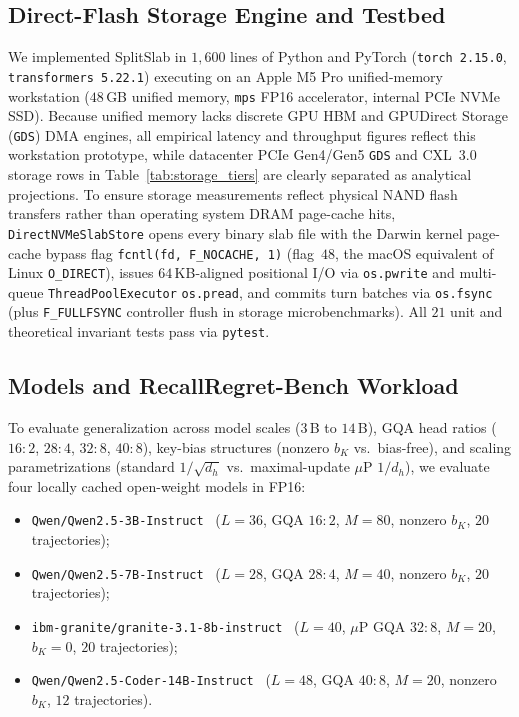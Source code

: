 \documentclass[final,5p,times,twocolumn]{elsarticle}
\theoremstyle{definition}
\theoremstyle{remark}
\newcommand{\SplitSlab}{\textup{\textsc{SplitSlab}}}
\newcommand{\RecallBench}{\textup{\textsc{RecallRegret-Bench}}}
\def\SplitSlab{SplitSlab}%
\def\RecallBench{RecallRegret-Bench}%
\begin{document}
\subsection{Direct-Flash Storage Engine and Testbed}
We implemented \SplitSlab{} in $1{,}600$ lines of Python and PyTorch (\texttt{torch 2.15.0}, \texttt{transformers 5.22.1}) executing on an Apple M5 Pro unified-memory workstation ($48$\,GB unified memory, \texttt{mps} FP16 accelerator, internal PCIe NVMe SSD). Because unified memory lacks discrete GPU HBM and GPUDirect Storage (\texttt{GDS}) DMA engines, all empirical latency and throughput figures reflect this workstation prototype, while datacenter PCIe Gen4/Gen5 \texttt{GDS} and CXL~3.0 storage rows in Table~\ref{tab:storage_tiers} are clearly separated as analytical projections. To ensure storage measurements reflect physical NAND flash transfers rather than operating system DRAM page-cache hits, \texttt{DirectNVMeSlabStore} opens every binary slab file with the Darwin kernel page-cache bypass flag \texttt{fcntl(fd, F\_NOCACHE, 1)} (flag~$48$, the macOS equivalent of Linux \texttt{O\_DIRECT}), issues $64$\,KB-aligned positional I/O via \texttt{os.pwrite} and multi-queue \texttt{ThreadPoolExecutor} \texttt{os.pread}, and commits turn batches via \texttt{os.fsync} (plus \texttt{F\_FULLFSYNC} controller flush in storage microbenchmarks). All $21$ unit and theoretical invariant tests pass via \texttt{pytest}.

\subsection{Models and \RecallBench{} Workload}
To evaluate generalization across model scales ($3$\,B to $14$\,B), GQA head ratios ($16{:}2$, $28{:}4$, $32{:}8$, $40{:}8$), key-bias structures (nonzero $b_K$ vs.\ bias-free), and scaling parametrizations (standard $1/\sqrt{d_h}$ vs.\ maximal-update $\mu\text{P}$ $1/d_h$), we evaluate four locally cached open-weight models in FP16:
\begin{itemize}
  \item \texttt{Qwen/Qwen2.5-3B-Instruct}~\cite{yang2024qwen25} ($L{=}36$, GQA $16{:}2$, $M{=}80$, nonzero $b_K$, $20$ trajectories);
  \item \texttt{Qwen/Qwen2.5-7B-Instruct}~\cite{yang2024qwen25} ($L{=}28$, GQA $28{:}4$, $M{=}40$, nonzero $b_K$, $20$ trajectories);
  \item \texttt{ibm-granite/granite-3.1-8b-instruct}~\cite{mishra2024granite} ($L{=}40$, $\mu\text{P}$ GQA $32{:}8$, $M{=}20$, $b_K{=}0$, $20$ trajectories);
  \item \texttt{Qwen/Qwen2.5-Coder-14B-Instruct}~\cite{yang2024qwen25} ($L{=}48$, GQA $40{:}8$, $M{=}20$, nonzero $b_K$, $12$ trajectories).
\end{itemize}
\end{document}
